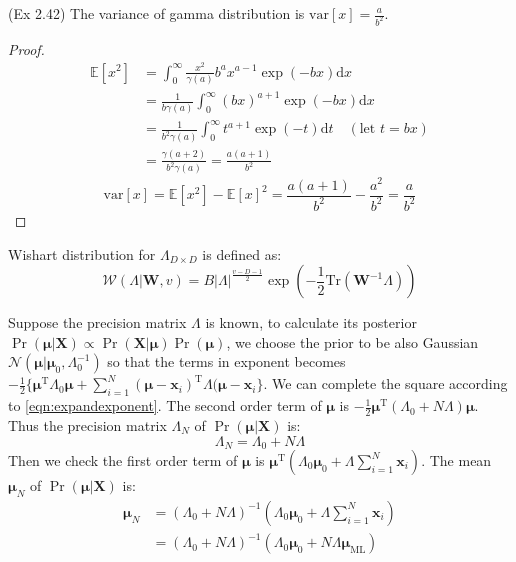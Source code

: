 \begin{conclusion}
(Ex 2.42) The variance of gamma distribution is $\text{var}[x]=\frac{a}{b^2}$.
\end{conclusion}
\begin{proof}
\begin{equation}
\begin{split}
\mathbb{E}[x^2]&=\int_{0}^{\infty}\frac{x^2}{\gamma(a)}b^{a}x^{a-1}\exp{}(-bx)\text{d}x\\
&=\frac{1}{b\gamma(a)}\int_{0}^{\infty}(bx)^{a+1}\exp{}(-bx)\text{d}x\\
&=\frac{1}{b^2\gamma(a)}\int_{0}^{\infty}t^{a+1}\exp{}(-t)\text{d}t\quad{}(\text{let }t=bx)\\
&=\frac{\gamma(a+2)}{b^2\gamma(a)}=\frac{a(a+1)}{b^2}
\end{split}
\end{equation}
\begin{equation}
\text{var}[x]=\mathbb{E}[x^2]-\mathbb{E}[x]^2=\frac{a(a+1)}{b^2}-\frac{a^2}{b^2}=\frac{a}{b^2}
\end{equation}
\end{proof}
\begin{definition}
Wishart distribution for $\Lambda_{D\times{}D}$ is defined as:
\begin{equation}
\mathcal{W}(\Lambda\vert\mathbf{W},v)=B\vert\Lambda\vert^{\frac{v-D-1}{2}}\exp{}(-\frac{1}{2}\text{Tr}(\mathbf{W}^{-1}\Lambda))
\end{equation}
\end{definition}
Suppose the precision matrix $\Lambda$ is known, to 
calculate its posterior $\Pr(\boldsymbol{\mu}\vert\mathbf{X})\varpropto\Pr(\mathbf{X}\vert\boldsymbol{\mu})\Pr(\boldsymbol{\mu})$, we choose the prior to be also Gaussian $\mathcal{N}(\boldsymbol{\mu}\vert\boldsymbol{\mu}_{0},\Lambda_{0}^{-1})$ so that 
the terms in exponent becomes $-\frac{1}{2}\{\boldsymbol{\mu}^{\mathrm{T}}\Lambda_{0}\boldsymbol{\mu}+\sum_{i=1}^{N}(\boldsymbol{\mu}-\mathbf{x}_{i})^{\mathrm{T}}\Lambda{}(\boldsymbol{\mu}-\mathbf{x}_{i}\}$.
We can complete the square according to \eqref{eqn:expandexponent}.  The second order term of $\boldsymbol{\mu}$ is $-\frac{1}{2}\boldsymbol{\mu}^{\mathrm{T}}(\Lambda_{0}+N\Lambda)\boldsymbol{\mu}$. Thus the precision matrix $\Lambda_{N}$ of $\Pr(\boldsymbol{\mu}\vert\mathbf{X})$ is:
\begin{equation}
\Lambda_{N}=\Lambda_{0}+N\Lambda
\end{equation}
Then we check the first order term of $\boldsymbol{\mu}$ is $\boldsymbol{\mu}^{\mathrm{T}}(\Lambda_{0}\boldsymbol{\mu}_{0}+\Lambda{}\sum_{i=1}^{N}\mathbf{x}_{i})$. 
The mean $\boldsymbol{\mu}_{N}$ of $\Pr(\boldsymbol{\mu}\vert\mathbf{X})$ is:
\begin{equation}
\begin{split}
\boldsymbol{\mu}_{N}&=(\Lambda_{0}+N\Lambda)^{-1}(\Lambda_{0}\boldsymbol{\mu}_{0}+\Lambda{}\sum_{i=1}^{N}\mathbf{x}_{i})\\
&=(\Lambda_{0}+N\Lambda)^{-1}(\Lambda_{0}\boldsymbol{\mu}_{0}+N\Lambda{}\boldsymbol{\mu}_{\text{ML}})
\end{split}
\end{equation}


